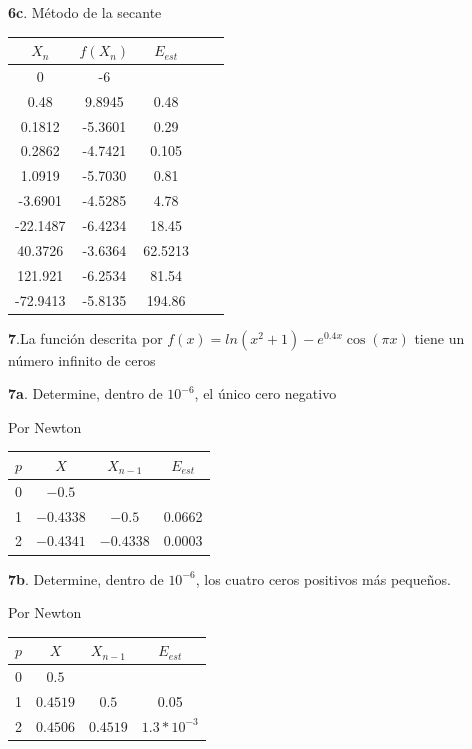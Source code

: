 \documentclass[12pt]{article}
\begin{document}
\textbf{6c}. Método de la secante

\begin{center}
    \begin{tabular}{|c|c|c|c|c|}
        \hline
        $X_n$&$f(X_n)$&$E_{est}$\\
        \hline
        0        &-6&  \\
        0.48     &9.8945&0.48\\
        0.1812  &-5.3601&0.29\\
        0.2862  &-4.7421&0.105\\
        1.0919  &-5.7030&0.81\\
        -3.6901  &-4.5285&4.78\\
        -22.1487  &-6.4234&18.45\\
        40.3726  &-3.6364&62.5213\\
        121.921  &-6.2534&81.54\\
        -72.9413  &-5.8135&194.86\\
        \hline
      \end{tabular} 
\end{center}


\textbf{7}.La función descrita por $f(x) = ln(x^2 + 1) - e^{0.4x}\cos(\pi x)$  tiene un número infinito de ceros

\textbf{7a}. Determine, dentro de $10^{-6}$, el único cero negativo

Por Newton

\begin{center}
    \begin{tabular}{|c|c|c|c|}
        \hline
        $p$&$X$&$X_{n-1}$&$E_{est}$\\
        \hline
        0 & $-0.5$&  & \\
        1 &$-0.4338$&$-0.5$&0.0662\\
        2 &$-0.4341$&$-0.4338$&0.0003\\
        \hline
      \end{tabular} 
\end{center}

\textbf{7b}. Determine, dentro de $10^{-6}$, los cuatro ceros positivos más pequeños.

Por Newton

\begin{center}
    \begin{tabular}{|c|c|c|c|}
        \hline
        $p$&$X$&$X_{n-1}$&$E_{est}$\\
        \hline
        0 & $0.5$&  & \\
        1 &$0.4519$&$0.5$&0.05\\
        2 &$0.4506$&$0.4519$&$1.3*10^{-3}$\\
        \hline
      \end{tabular} 
\end{center}
\end{document}
